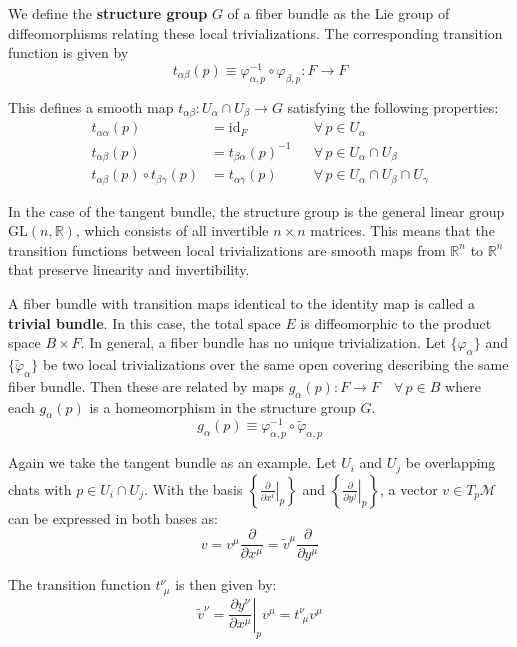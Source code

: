 We define the \textbf{structure group} $G$ of a fiber bundle as the Lie group of diffeomorphisms relating these local trivializations. The corresponding transition function is given by
\[
t_{\alpha\beta}(p) \equiv \varphi_{\alpha,p}^{-1} \circ \varphi_{\beta,p} : F \to F
\]

This defines a smooth map $t_{\alpha\beta}: U_\alpha \cap U_\beta \to G$ satisfying the following properties:
\begin{align*}
  t_{\alpha \alpha}(p) &= \mathrm{id}_F && \forall\, p \in U_\alpha \\
  t_{\alpha\beta}(p) &= t_{\beta\alpha}(p)^{-1} && \forall\, p \in U_\alpha \cap U_\beta \\
  t_{\alpha\beta}(p) \circ t_{\beta\gamma}(p) &= t_{\alpha\gamma}(p) && \forall\, p \in U_\alpha \cap U_\beta \cap U_\gamma
\end{align*}

In the case of the tangent bundle, the structure group is the general linear group $\mathrm{GL}(n, \mathbb{R})$, which consists of all invertible $n \times n$ matrices. This means that the transition functions between local trivializations are smooth maps from $\mathbb{R}^n$ to $\mathbb{R}^n$ that preserve linearity and invertibility.

A fiber bundle with transition maps identical to the identity map is called a \textbf{trivial bundle}. In this case, the total space $E$ is diffeomorphic to the product space $B \times F$.
In general, a fiber bundle has no unique trivialization. Let $\{\varphi_\alpha\}$ and $\{\tilde{\varphi}_\alpha\}$ be two local trivializations over the same open covering describing the same fiber bundle. Then these are related by maps $g_\alpha(p) : F \to F \quad \forall\, p \in B$ where each $g_\alpha(p)$ is a homeomorphism in the structure group $G$.
\[
g_\alpha(p) \equiv \varphi_{\alpha,p}^{-1} \circ \tilde{\varphi}_{\alpha,p}
\]


Again we take the tangent bundle as an example. Let $U_i$ and $U_j$ be overlapping chats with $p \in U_i \cap U_j$. With the basis $\left\{ \left. \frac{\partial}{\partial x^i} \right|_p \right\}$ and $\left\{ \left. \frac{\partial}{\partial y^j} \right|_p \right\}$, a vector $v \in T_p\mathcal{M}$ can be expressed in both bases as:
\[
v = v^{\mu} \frac{\partial}{\partial x^{\mu}} = \tilde{v}^{\mu} \frac{\partial}{\partial y^{\mu}}
\]

The transition function $t^\nu_{\,\,\mu}$ is then given by:
\[ \tilde{v}^\nu = \left.\frac{\partial y^\nu}{\partial x^\mu}\right|_p v^\mu = t^\nu_{\,\,\mu}v^\mu \]

